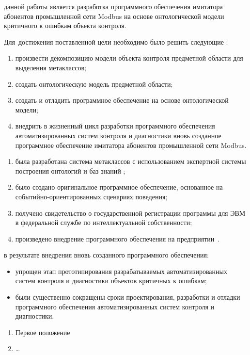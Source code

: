 {\aim} данной работы является разработка программного обеспечения 
  имитатора абонентов промышленной сети Modbus на основе онтологической модели критичного к ошибкам объекта контроля.

Для~достижения поставленной цели необходимо было решить следующие {\tasks}:
\begin{enumerate}
  \item произвести декомпозицию модели объекта контроля предметной области для выделения метаклассов;
  \item создать онтологическую модель предметной области;
  \item создать и отладить программное обеспечение на основе онтологической модели;
  \item внедрить в жизненный цикл разработки программного обеспечения автоматизированных систем контроля и диагностики
        вновь созданное программное обеспечение имитатора абонентов промышленной сети Modbus.
\end{enumerate}


{\novelty}
\begin{enumerate}
  \item была разработана система метаклассов с использованием экспертной системы построения онтологий и баз знаний \protege;
  \item было создано оригинальное программное обеспечение, основанное на событийно-ориентированных сценариях поведения;
  \item получено свидетельство о государственной регистрации программы для ЭВМ в федеральной службе по интеллектуальной собственности;
  \item произведено внедрение программного обеспечения на предприятии~\leadingOrganizationTitle.
\end{enumerate}

{\influence} в результате внедрения вновь созданного программного обеспечения:
\begin{itemize}
  \item упрощен этап прототипирования разрабатываемых автоматизированных систем контроля и диагностики объектов критичных к ошибкам;
  \item были существенно сокращены сроки проектирования, разработки и отладки программного обеспечения автоматизированных систем контроля и диагностики.
\end{itemize}

\todo{{\methods} \ldots}

\begin{enumerate}
  \item Первое положение
  \item \ldots
\end{enumerate}

